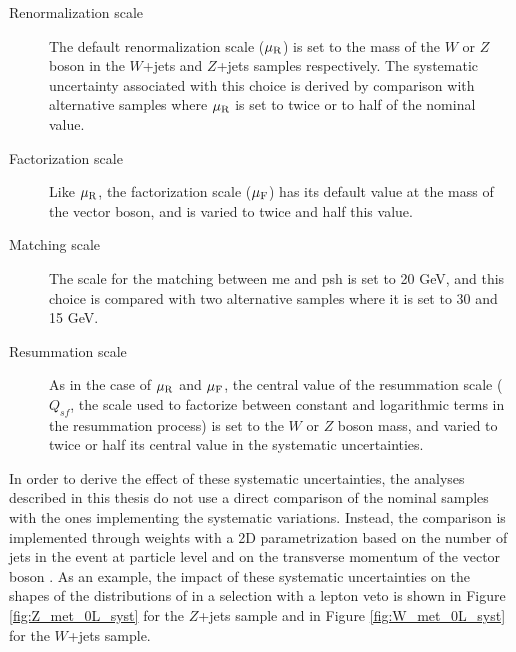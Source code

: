 \begin{description}
\item[Renormalization scale] The default renormalization scale ($\mu_{\rm{R}}$) is set to the mass of the $W$ or $Z$ boson in the $W$+jets and $Z$+jets samples respectively. 
The systematic uncertainty associated with this choice is derived by comparison with alternative samples where $\mu_{\rm{R}}$ is set to twice or to half of the nominal value. 

\item[Factorization scale] Like $\mu_{\rm{R}}$, the factorization scale ($\mu_{\rm{F}}$) has its default value at the mass of the vector boson, and is varied to twice and half this value.

\item[Matching scale] The scale for the matching between \gls{me} and \gls{psh} is set to 20 GeV, and this choice is compared with two alternative samples where it is set to 30 and 15 GeV.

\item[Resummation scale] As in the case of $\mu_{\rm{R}}$ and $\mu_{\rm{F}}$, the central value of the resummation scale ($Q_{sf}$, the scale used to factorize between constant and logarithmic terms
in the resummation process) is set to the $W$ or $Z$ boson mass, and varied to twice or half its central value in the systematic uncertainties. 

\end{description}

In order to derive the effect of these systematic uncertainties, the analyses described in this thesis do not use a direct comparison of the nominal 
samples with the ones implementing the systematic variations.
Instead, the comparison is implemented through weights with a 2D parametrization based on the number of jets in the event at particle level 
and on the transverse momentum of the vector boson \cite{Anders:2291836}.
As an example, the impact of these systematic uncertainties on the shapes of the distributions of \met in a selection with a lepton veto is shown in Figure \ref{fig:Z_met_0L_syst} for the $Z$+jets sample and in Figure \ref{fig:W_met_0L_syst} for the $W$+jets sample.  

